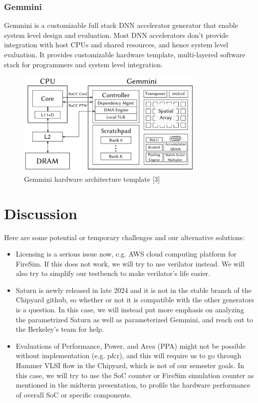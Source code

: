 \documentclass[conference]{IEEEtran}
\begin{document}
\subsubsection{Gemmini}
Gemmini is a customizable full stack DNN accelerator generator that enable system level design and evaluation. Most DNN accelerators don't provide integration with host CPUs and shared resources, and hence system level evaluation. It provides customizable hardware template, multi-layered software stack for programmers and system level integration.

\begin{figure}[htbp]
\centerline{\includegraphics{Gemmini.png}}
\caption{Gemmini hardware architecture template [3]}
\label{fig}
\end{figure}


\section{Discussion}
Here are some potential or temporary challenges and our alternative solutions:\\
\begin{itemize}
    \item Licensing is a serious issue now, e.g. AWS cloud computing platform for FireSim. If this does not work, we will try to use verilator instead.  We will also try to simplify our testbench to make verilator's life easier. 
    \item Saturn is newly released in late 2024 and it is not in the stable branch of the Chipyard github, so whether or not it is compatible with the other generators is a question. In this case, we will instead put more emphasis on analyzing the parametrized Saturn as well as parameterized Gemmini, and reach out to the Berkeley's team for help. 
    \item Evaluations of Performance, Power, and Area (PPA) might not be possible without implementation (e.g. p\&r), and this will require us to go through Hammer VLSI flow in the Chipyard, which is not of our semester goals. In this case, we will try to use the SoC counter or FireSim simulation counter as mentioned in the midterm presentation, to profile the hardware performance of overall SoC or specific components.
\end{itemize}
\end{document}
